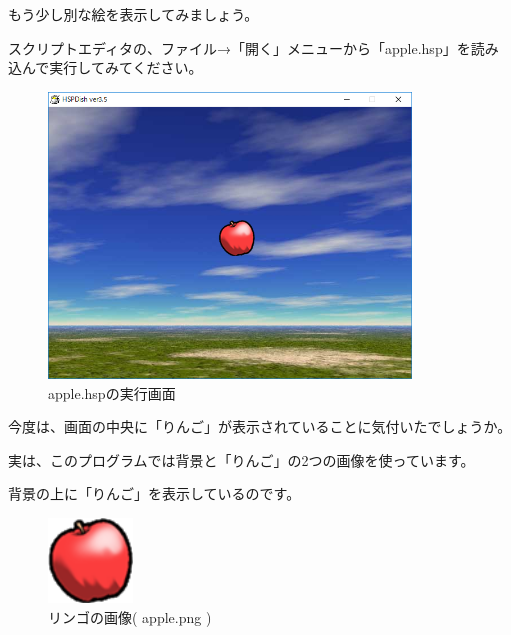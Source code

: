 もう少し別な絵を表示してみましょう。

スクリプトエディタの、ファイル→「開く」メニューから「apple.hsp」を読み込んで実行してみてください。

\begin{figure}[H]
    \begin{center}
      \includegraphics[keepaspectratio,width=9.634cm,height=7.599cm]{text04-img/s_applehsp.png}
      \caption{apple.hspの実行画面}
    \end{center}
    \label{fig:prog_menu}
\end{figure}

今度は、画面の中央に「りんご」が表示されていることに気付いたでしょうか。


実は、このプログラムでは背景と「りんご」の2つの画像を使っています。

背景の上に「りんご」を表示しているのです。


\begin{figure}[H]
    \begin{center}
      \includegraphics[keepaspectratio,width=2.249cm,height=2.249cm]{text04-img/s_apple.png}
      \caption{リンゴの画像( apple.png )}
    \end{center}
    \label{fig:prog_menu}
\end{figure}



